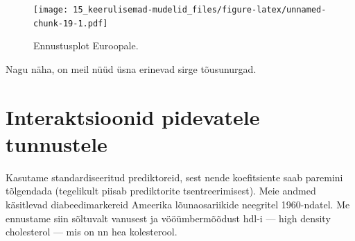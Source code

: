 \documentclass[]{book}
\newenvironment{Shaded}{\begin{snugshade}}{\end{snugshade}}
\newcommand{\KeywordTok}[1]{\textcolor[rgb]{0.13,0.29,0.53}{\textbf{#1}}}
\newcommand{\DataTypeTok}[1]{\textcolor[rgb]{0.13,0.29,0.53}{#1}}
\newcommand{\StringTok}[1]{\textcolor[rgb]{0.31,0.60,0.02}{#1}}
\newcommand{\OperatorTok}[1]{\textcolor[rgb]{0.81,0.36,0.00}{\textbf{#1}}}
\newcommand{\NormalTok}[1]{#1}
\begin{document}
\begin{figure}
\centering
\texttt{[image: 15\_keerulisemad-mudelid\_files/figure-latex/unnamed-chunk-19-1.pdf]}
\caption{\label{fig:unnamed-chunk-19}Ennustusplot Euroopale.}
\end{figure}

Nagu näha, on meil nüüd üsna erinevad sirge tõusunurgad.

\section*{Interaktsioonid pidevatele
tunnustele}\label{interaktsioonid-pidevatele-tunnustele}

Kasutame standardiseeritud prediktoreid, sest nende koefitsiente saab
paremini tõlgendada (tegelikult piisab prediktorite tsentreerimisest).
Meie andmed käsitlevad diabeedimarkereid Ameerika lõunaosariikide
neegritel 1960-ndatel. Me ennustame siin sõltuvalt vanusest ja
vööümbermõõdust hdl-i --- high density cholesterol --- mis on nn hea
kolesterool.

\begin{Shaded}
\end{Shaded}
\end{document}
